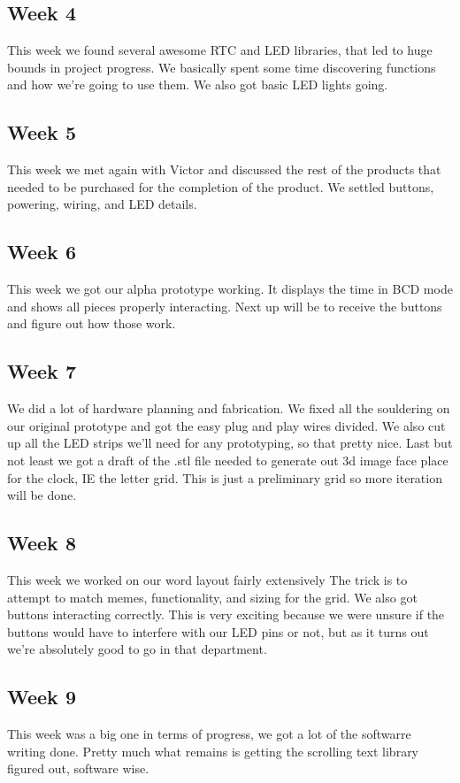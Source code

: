 \documentclass[onecolumn, draftclsnofoot,10pt, compsoc]{IEEEtran}
\begin{document}
\subsection{Week 4}
This week we found several awesome RTC and LED libraries, that led to huge bounds in project progress.
We basically spent some time discovering functions and how we're going to use them.
We also got basic LED lights going.

\subsection{Week 5}
This week we met again with Victor and discussed the rest of the products that needed to be purchased for the completion of the product.
We settled buttons, powering, wiring, and LED details.

\subsection{Week 6}
This week we got our alpha prototype working.
It displays the time in BCD mode and shows all pieces properly interacting.
Next up will be to receive the buttons and figure out how those work.

\subsection{Week 7}
We did a lot of hardware planning and fabrication.
We fixed all the souldering on our original prototype and got the easy plug and play wires divided.
We also cut up all the LED strips we'll need for any prototyping, so that pretty nice.
Last but not least we got a draft of the .stl file needed to generate out 3d image face place for the clock, IE the letter grid.
This is just a preliminary grid so more iteration will be done.

\subsection{Week 8}
This week we worked on our word layout fairly extensively The trick is to attempt to match memes, functionality, and sizing for the grid.
We also got buttons interacting correctly.
This is very exciting because we were unsure if the buttons would have to interfere with our LED pins or not, but as it turns out we're absolutely good to go in that department.

\subsection{Week 9}
This week was a big one in terms of progress, we got a lot of the softwarre writing done.
Pretty much what remains is getting the scrolling text library figured out, software wise.
\end{document}

